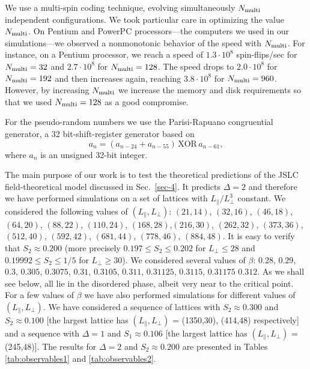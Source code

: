 \documentclass[12pt]{article}
\begin{document}
We use a multi-spin coding technique, evolving simultaneously $N_{\rm multi}$
independent configurations. We took particular care in optimizing 
the value $N_{\rm multi}$. On Pentium and PowerPC processors---the
computers we used in our simulations---we observed a nonmonotonic
behavior of the speed with $N_{\rm multi}$. 
For instance, on a Pentium processor,  we reach a speed of 
$1.3\cdot 10^8$ spin-flips/sec for $N_{\rm multi} = 32$ and
$2.7 \cdot 10^8$ for $N_{\rm multi} = 128$. The speed drops to
$2.0\cdot 10^8$ for $N_{\rm multi} = 192$ and then increases again,
reaching $3.8 \cdot 10^8$ for $N_{\rm multi} = 960$.
However, by increasing $N_{\rm multi}$ we increase the memory and 
disk requirements so that we used $N_{\rm multi} = 128$ as a good 
compromise.

For the pseudo-random numbers we use the Parisi-Rapuano congruential
generator, a 32 bit-shift-register generator based on 
\begin{equation}
a_n = (a_{n-24} + a_{n-55}) \,\text{XOR}\, a_{n-61},
\end{equation}
where $a_n$ is an unsigned 32-bit integer.

The main purpose of our work is to test the theoretical predictions of the
JSLC field-theoretical model
discussed in Sec.~\ref{sec-4}. It predicts $\Delta=2$ and therefore 
we have performed 
simulations on a set of lattices with $L_\|/L_\bot^3$ constant. 
We considered the following values of $(L_\|,L_\bot)$: $(21,14)$,
$(32,16)$, $(46,18)$, $(64,20)$, $(88,22)$, $(110,24)$,
$(168,28)$,$(216,30)$, $(262,32)$, $(373,36)$, $(512,40)$, $(592,42)$,
$(681,44)$, $(778,46)$,
$(884,48)$. It is easy to verify that $S_2 \approx 0.200$ (more precisely 
$0.197 \le S_2 \le 0.202$ for $L_\bot \le 28$ and 
$0.19992\le S_2 \le 1/5$ for $L_\bot \ge 30$). 
We considered several values of 
$\beta$: $0.28$, $0.29$, $0.3$, $0.305$, $0.3075$, $0.31$, $0.3105$,
$0.311$, $0.31125$, $0.3115$, $0.31175$ $0.312$. As we shall see below,
all lie in the
disordered phase, albeit very near to the critical point.
For a few values of $\beta$ we have also performed simulations 
for different values of $(L_\|,L_\bot)$. We have considered a sequence 
of lattices with $S_2\approx 0.300$ and $S_2\approx 0.100$ [the largest 
lattice has $(L_\|,L_\bot)$ = (1350,30), (414,48) respectively] and a sequence 
with $\Delta = 1$ and $S_1\approx 0.106$ [the largest
lattice has $(L_\|,L_\bot)$ = (245,48)]. The results for $\Delta = 2$ and 
$S_2 \approx 0.200$ are presented in Tables 
\ref{tab:observables1} and \ref{tab:observables2}.
\end{document}
